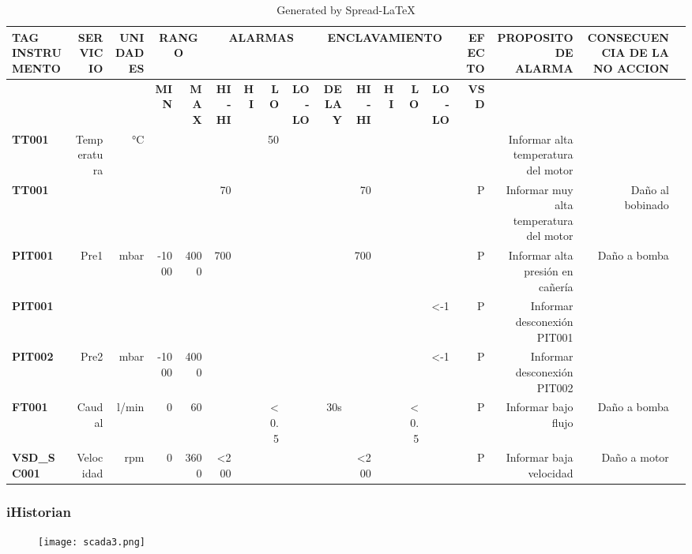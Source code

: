 \begin{table}[!htp]\centering
	\caption{Generated by Spread-LaTeX}\label{tab: }
	\scriptsize
	\begin{tabular}{|l|r|r|r|r|r|r|r|r|r|r|r|r|r|r|r|r|r|}\toprule
		\multirow{2}{*}{\textbf{TAG INSTRUMENTO}} &\multirow{2}{*}{\textbf{SERVICIO}} &\multirow{2}{*}{\textbf{UNIDADES}} &\multicolumn{2}{c}{\textbf{RANGO}} &\multicolumn{4}{c}{\textbf{ALARMAS}} &\multicolumn{5}{c}{\textbf{ENCLAVAMIENTO}} &\textbf{EFECTO} &\multirow{2}{*}{\textbf{PROPOSITO DE ALARMA}} &\multirow{2}{*}{\textbf{CONSECUENCIA DE LA NO ACCION}} \\  \hline
		& & &\textbf{MIN} &\textbf{MAX} &\textbf{HI-HI} &\textbf{HI} &\textbf{LO} &\textbf{LO-LO} &\textbf{DELAY} &\textbf{HI-HI} &\textbf{HI} &\textbf{LO} &\textbf{LO-LO} &\textbf{VSD} & & \\  \hline
		\textbf{TT001} &\multirow{2}{*}{Temperatura} &\multirow{2}{*}{°C} &\multirow{2}{*}{} &\multirow{2}{*}{} & & &50 & & & & & & & &Informar alta temperatura del motor & \\  \hline
		\textbf{TT001} & & & & &70 & & & & &70 & & & &P &Informar muy alta temperatura del motor &Daño al bobinado \\  \hline
		\textbf{PIT001} &\multirow{2}{*}{Pre1} &\multirow{2}{*}{mbar} &\multirow{2}{*}{-1000} &\multirow{2}{*}{4000} &700 & & & & &700 & & & &P &Informar alta presión en cañería &Daño a bomba \\  \hline
		\textbf{PIT001} & & & & & & & & & & & & &<-1 &P &Informar desconexión PIT001 & \\  \hline
		\textbf{PIT002} &Pre2 &mbar &-1000 &4000 & & & & & & & & &<-1 &P &Informar desconexión PIT002 & \\  \hline
		\textbf{FT001} &Caudal &l/min &0 &60 & & &<0.5 & &30s & & &<0.5 & &P &Informar bajo flujo &Daño a bomba \\  \hline
		\textbf{VSD\_SC001} &Velocidad &rpm &0 &3600 &<200 & & & & &<200 & & & &P &Informar baja velocidad &Daño a motor \\  \hline
		\bottomrule
	\end{tabular}
\end{table}


\subsubsection{iHistorian}
\begin{figure}[htb]
	\centering
	\texttt{[image: scada3.png]}
	\label{fig:scada3}
\end{figure}

